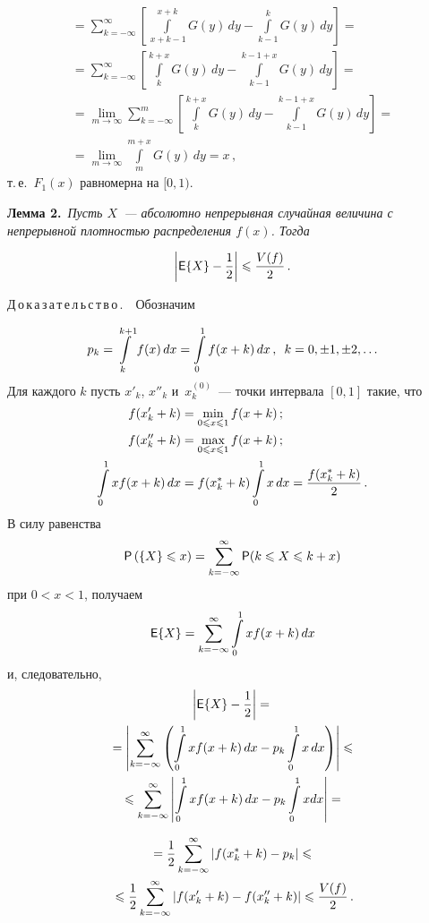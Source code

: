 \begin{multicols}{2}
\noindent
\begin{multline*}
{}=\sum\limits_{k=-\infty}^\infty
\left[
\int\limits_{\,x+k-1}^{x+k}G(y)\,dy-\int\limits_{k-1}^{k}G(y)\,dy
\right]={}\\
{}=\sum\limits_{k=-\infty}^\infty
\left[
\int\limits_{k}^{k+x}G(y)\,dy-\int\limits_{k-1}^{k-1+x}G(y)\,dy
\right]={}\\
{}=\lim_{m\to\infty}\sum\limits_{k=-\infty}^m
\left[
\int\limits_{k}^{k+x}G(y)\,dy-\int\limits_{k-1}^{k-1+x}G(y)\,dy
\right]={}\\
{}=\lim_{m\to\infty}\int\limits_{m}^{m+x}G(y)\,dy=x\,,
\end{multline*}
т.\,е.\ $F_1(x)$ равномерна на $[0,1)$.

\smallskip

\noindent
\textbf{Лемма 2.}\ \textit{Пусть $X$~--- абсолютно непрерывная случайная величина
с непрерывной плотностью распределения $f(x)$. Тогда}

\noindent
$$
\left|{\sf E}\{X\}-\displaystyle\frac{\displaystyle 1\mathstrut}{\displaystyle 2\mathstrut}\right|\leqslant\displaystyle\frac{\displaystyle {V}(f)\mathstrut}{\displaystyle 2\mathstrut}\,.
$$


\noindent
Д\,о\,к\,а\,з\,а\,т\,е\,л\,ь\,с\,т\,в\,о\,.\ \ Обозначим

\noindent
$$
p_k=\int\limits_k^{k+1}f(x)\,dx=\int\limits_0^1f(x+k)\,dx\,,\enskip k=0,\pm1,\pm2,\ldots
$$
Для каждого $k$ пусть $x'_k$, $x''_k$ и~$x^{(0)}_k$~--- точки интервала
$[0,1]$ такие, что
\begin{align*}
f(x'_k+k)&=\min\limits_{0\leqslant x\leqslant1}f(x+k)\,;\\
f(x''_k+k)&=\max\limits_{0\leqslant x\leqslant 1}f(x+k)\,;\\
\int\limits_0^1xf(x+k)\,dx&=f(x^\ast_k+k)\int\limits_0^1x\,dx=
\displaystyle\frac{\displaystyle f(x^\ast_k+k)\mathstrut}{\displaystyle 2\mathstrut}\,.
\end{align*}
В силу равенства
$$
{\sf P}\left(\{X\}\leqslant x\right)=\sum\limits_{k=-\infty}^\infty 
{\sf P}(k\leqslant X\leqslant k+x)
$$
при $0<x<1$, получаем
$$
{\sf E}\{X\}=\sum\limits_{k=-\infty}^\infty\int\limits_0^1xf(x+k)\,dx
$$
и, следовательно,
\begin{multline*}
\left|{\sf E}{\{X\}}-\displaystyle\frac{\displaystyle 1\mathstrut}{\displaystyle 2\mathstrut}\right|={}\\
{}=
\left|\sum\limits_{k=-\infty}^\infty\left(\int\limits_0^1xf(x+k)\,dx-
p_k\int\limits_0^1x\,dx\right)\right|\leqslant{}\\
{}\leqslant\sum\limits_{k=-\infty}^\infty\left|\int\limits_0^1xf(x+k)\,dx-
p_k\int\limits_0^1xdx\right|={}
\end{multline*}

\noindent
\begin{multline*}
{}=
\displaystyle\frac{\displaystyle 1\mathstrut}{\displaystyle 2\mathstrut}\sum\limits_{k=-\infty}^\infty|f(x^\ast_k+k)-p_k|\leqslant{}\\
{}\leqslant\displaystyle\frac{\displaystyle 1\mathstrut}{\displaystyle 2\mathstrut}\sum\limits_{k=-\infty}^\infty|f(x'_k+k)-f(x''_k+k)|\leqslant
\displaystyle\frac{\displaystyle {V}(f)\mathstrut}{\displaystyle 2\mathstrut}\,.
\end{multline*}


\end{multicols}
